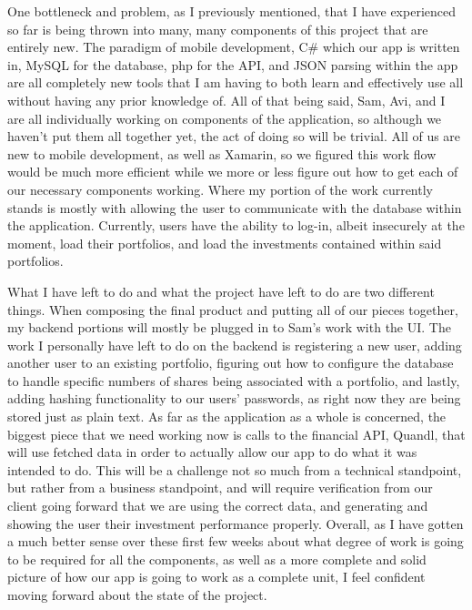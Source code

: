 \documentclass[letterpaper,10pt,titlepage,journal,compsoc,draftclsnofoot,onecolumn]{IEEEtran}
\begin{document}
One bottleneck and problem, as I previously mentioned, that I have experienced so far is being thrown into many, many components of this project that are entirely new. The paradigm of mobile development, C# which our app is written in, MySQL for the database, php for the API, and JSON parsing within the app are all completely new tools that I am having to both learn and effectively use all without having any prior knowledge of.
All of that being said, Sam, Avi, and I are all individually working on components of the application, so although we haven’t put them all together yet, the act of doing so will be trivial. All of us are new to mobile development, as well as Xamarin, so we figured this work flow would be much more efficient while we more or less figure out how to get each of our necessary components working. Where my portion of the work currently stands is mostly with allowing the user to communicate with the database within the application. Currently, users have the ability to log-in, albeit insecurely at the moment, load their portfolios, and load the investments contained within said portfolios.  


What I have left to do and what the project have left to do are two different things. When composing the final product and putting all of our pieces together, my backend portions will mostly be plugged in to Sam’s work with the UI. The work I personally have left to do on the backend is registering a new user, adding another user to an existing portfolio, figuring out how to configure the database to handle specific numbers of shares being associated with a portfolio, and lastly, adding hashing functionality to our users’ passwords, as right now they are being stored just as plain text. As far as the application as a whole is concerned, the biggest piece that we need working now is calls to the financial API, Quandl, that will use fetched data in order to actually allow our app to do what it was intended to do. This will be a challenge not so much from a technical standpoint, but rather from a business standpoint, and will require verification from our client going forward that we are using the correct data, and generating and showing the user their investment performance properly. Overall, as I have gotten a much better sense over these first few weeks about what degree of work is going to be required for all the components, as well as a more complete and solid picture of how our app is going to work as a complete unit, I feel confident moving forward about the state of the project.
\end{document}
